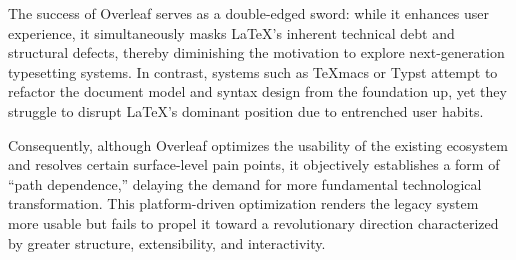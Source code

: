 The success of Overleaf serves as a double-edged sword: while it enhances user experience, it simultaneously masks \LaTeX{}'s inherent technical debt and structural defects, thereby diminishing the motivation to explore next-generation typesetting systems. In contrast, systems such as \TeX{}macs or Typst attempt to refactor the document model and syntax design from the foundation up, yet they struggle to disrupt \LaTeX{}'s dominant position due to entrenched user habits.

Consequently, although Overleaf optimizes the usability of the existing ecosystem and resolves certain surface-level pain points, it objectively establishes a form of ``path dependence,'' delaying the demand for more fundamental technological transformation. This platform-driven optimization renders the legacy system more usable but fails to propel it toward a revolutionary direction characterized by greater structure, extensibility, and interactivity.
